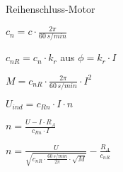 \documentclass[german]{latex4ei/latex4ei_sheet}
\begin{document}
\begin{sectionbox}
				\begin{symbolbox}{Reihenschluss-Motor}
					\item $c_n = c\cdot \frac{2\pi}{60\,s/min}$
					\item $c_{nR} = c_n \cdot k_r$ aus $\phi= k_r \cdot I$
					\item $M = c_{nR}\cdot \frac{2\pi}{60\,s/min}\cdot I^2$
					\item $U_{ind} = c_{Rn}\cdot I \cdot n$
					\item $n = \frac{U-I\cdot R_A}{c_{Rn}\cdot I}$
					\item $n = \frac{U}{\sqrt{c_{nR}\cdot \frac{60\,s/min}{2\pi} \cdot \sqrt{M}}}-\frac{R_A}{c_{nR}}$
				\end{symbolbox}
		\end{sectionbox}
	
\end{document}
